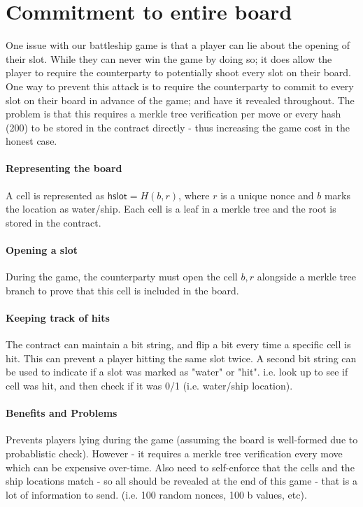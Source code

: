 \documentclass{llncs}
\newcommand{\hslot}{\mathsf{hslot}}
\begin{document}
\appendix

\section{Commitment to entire board}

One issue with our battleship game is that a player can lie about the opening of their slot. While they can never win the game by doing so; it does allow the player to require the counterparty to potentially shoot every slot on their board. One way to prevent this attack is to require the counterparty to commit to every slot on their board in advance of the game; and have it revealed throughout. The problem is that this requires a merkle tree verification per move or every hash (200) to be stored in the contract directly - thus increasing the game cost in the honest case. 


\paragraph{Representing the board}

A cell is represented as $\hslot = H(b, r)$, where  $r$ is a unique nonce and $b$ marks the location as water/ship. 
Each cell is a leaf in a merkle tree and the root is stored in the contract. 

\paragraph{Opening a slot} 

During the game, the counterparty must open the cell $b,r$ alongside a merkle tree branch to prove that this cell is included in the board. 

\paragraph{Keeping track of hits} The contract can maintain a bit string, and flip a bit every time a specific cell is hit. This can prevent a player hitting the same slot twice. A second bit string can be used to indicate if a slot was marked as "water" or "hit". i.e. look up to see if cell was hit, and then check if it was 0/1 (i.e. water/ship location). 

\paragraph{Benefits and Problems} Prevents players lying during the game (assuming the board is well-formed due to probablistic check). However - it requires a merkle tree verification every move which can be expensive over-time. Also need to self-enforce that the cells and the ship locations match - so all should be revealed at the end of this game - that is a lot of information to send. (i.e. 100 random nonces, 100 b values, etc). 
\end{document}
